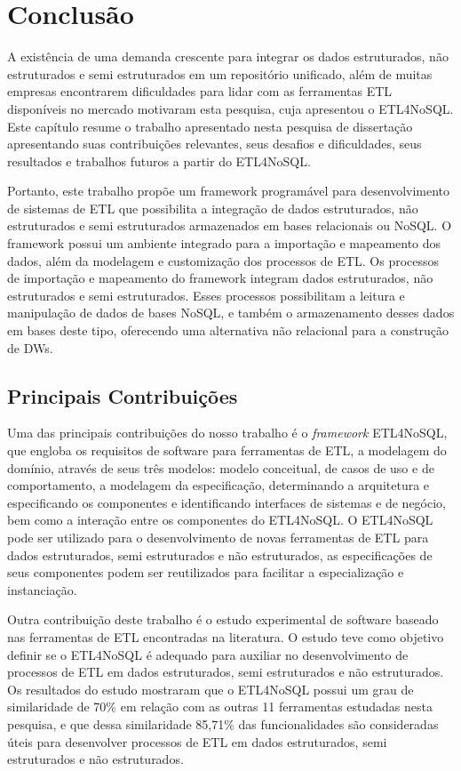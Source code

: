 \chapter{Conclusão}


A existência de uma demanda crescente para integrar os dados estruturados, não estruturados e semi estruturados em um repositório unificado, além de muitas empresas encontrarem dificuldades para lidar com as ferramentas ETL disponíveis no mercado motivaram esta pesquisa, cuja apresentou o ETL4NoSQL. Este capítulo resume o trabalho apresentado nesta pesquisa de dissertação apresentando suas contribuições relevantes, seus desafios e dificuldades, seus resultados e trabalhos futuros a partir do ETL4NoSQL. 


Portanto, este trabalho propõe um framework programável para desenvolvimento de sistemas de ETL que possibilita a integração de dados estruturados, não estruturados e semi estruturados armazenados em bases relacionais ou NoSQL. O framework possui um ambiente integrado para a importação e mapeamento dos dados, além da modelagem e customização dos processos de ETL. Os processos de importação e mapeamento do framework integram dados estruturados, não estruturados e semi estruturados. Esses processos possibilitam a leitura e manipulação de dados de bases NoSQL, e também o armazenamento desses dados em bases deste tipo, oferecendo uma alternativa não relacional para a construção de DWs.

\clearpage

\section{Principais Contribuições}

Uma das principais contribuições do nosso trabalho é o \textit{framework} ETL4NoSQL, que engloba os requisitos de software para ferramentas de ETL, a modelagem do domínio, através de seus três modelos: modelo conceitual, de casos de uso e de comportamento, a modelagem da especificação, determinando a arquitetura e especificando os componentes e identificando interfaces de sistemas e de negócio, bem como a interação entre os componentes do ETL4NoSQL. O ETL4NoSQL pode ser utilizado para o desenvolvimento de novas ferramentas de ETL para dados estruturados, semi estruturados e não estruturados, as especificações de seus componentes podem ser reutilizados para facilitar a especialização e instanciação.

Outra contribuição deste trabalho é o estudo experimental de software baseado nas ferramentas de ETL encontradas na literatura. O estudo teve como objetivo definir se o ETL4NoSQL é adequado para auxiliar no desenvolvimento de processos de ETL em dados estruturados, semi estruturados e não estruturados. Os resultados do estudo mostraram que o ETL4NoSQL possui um grau de similaridade de 70\% em relação com as outras 11 ferramentas estudadas nesta pesquisa, e que dessa similaridade 85,71\% das funcionalidades são consideradas úteis para desenvolver processos de ETL em dados estruturados, semi estruturados e não estruturados. 

